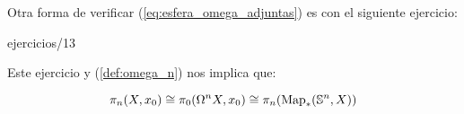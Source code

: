 \documentclass[../../topologia_algebraica]{subfiles}
\begin{document}
Otra forma de verificar (\ref{eq:esfera_omega_adjuntas}) es con el siguiente ejercicio:

{ejercicios/13} %

Este ejercicio y (\ref{def:omega_n}) nos implica que:

\begin{cor}
  \[
    \pi_n(X,x_0)\cong\pi_0(\Omega^nX,x_0)\cong\pi_n(\text{Map}_*(\mathbb{S}^n,X))
  \]
\end{cor}
\end{document}
